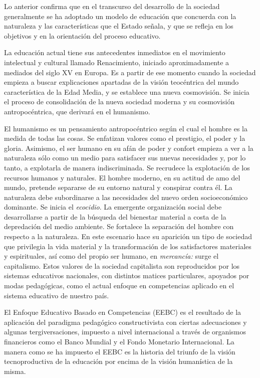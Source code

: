 Lo anterior confirma que en el transcurso del desarrollo de la sociedad 
generalmente se ha adoptado un modelo de educación que concuerda con la 
naturaleza y las características que el Estado señala, y que se refleja 
en los objetivos y en la orientación del proceso educativo.  

La educación actual tiene sus antecedentes inmediatos en el movimiento 
intelectual y cultural llamado Renacimiento, iniciado aproximadamente a 
mediados del siglo XV en Europa. Es a partir de ese momento cuando la 
sociedad empieza a buscar explicaciones apartadas de la visión 
teocéntrica del mundo característica de la Edad Media, y se establece  
una nueva cosmovisión. Se inicia el proceso de consolidación de la 
nueva sociedad moderna y su cosmovisión antropocéntrica, que derivará 
en el humanismo.

El humanismo es un pensamiento antropocéntrico según el cual el hombre 
es la medida de todas las cosas. Se enfatizan valores como el 
prestigio, el poder y la gloria. Asimismo, el ser humano en su afán de 
poder y confort empieza a ver a la naturaleza sólo como un medio para 
satisfacer sus nuevas necesidades y, por lo tanto, a explotarla de 
manera indiscriminada. Se recrudece la explotación de los recursos 
humanos y naturales. El hombre moderno, en su actitud de amo del mundo, 
pretende separarse de su entorno natural y conspirar contra él. La 
naturaleza debe subordinarse a las necesidades del  nuevo orden 
socioeconómico dominante. Se inicia el \textit{ecocidio\/}. La emergente 
organización social debe desarrollarse a partir de la búsqueda del 
bienestar material a costa de la depredación del medio ambiente. Se 
fortalece la separación del hombre con respecto a la naturaleza. En 
este escenario hace su aparición un tipo de sociedad que privilegia la 
vida material y la transformación de los satisfactores materiales y 
espirituales, así como del propio ser humano, en \textit{mercancía:} 
surge el capitalismo. Estos valores de la sociedad capitalista son 
reproducidos por los sistemas educativos nacionales, con distintos 
matices particulares, apoyados por modas pedagógicas, como el actual 
enfoque en competencias aplicado en el sistema educativo de nuestro 
país.

El Enfoque Educativo Basado en Competencias (EEBC) es el resultado de 
la aplicación del paradigma pedagógico constructivista con ciertas 
adecuaciones y algunas tergiversaciones, impuesto a nivel internacional 
a través de organismos financieros como el Banco Mundial y el Fondo 
Monetario Internacional. La manera como se ha impuesto el EEBC es la 
historia del triunfo de la visión tecnoproductiva de la educación por 
encima de la visión humanística de la misma.

